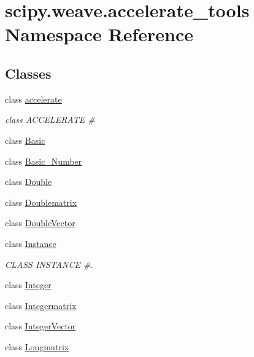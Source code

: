 \hypertarget{namespacescipy_1_1weave_1_1accelerate__tools}{}\section{scipy.\+weave.\+accelerate\+\_\+tools Namespace Reference}
\label{namespacescipy_1_1weave_1_1accelerate__tools}
\subsection*{Classes}
\begin{DoxyCompactItemize}
\item 
class \hyperlink{classscipy_1_1weave_1_1accelerate__tools_1_1accelerate}{accelerate}
\begin{DoxyCompactList}\small\item\em class A\+C\+C\+E\+L\+E\+R\+A\+T\+E \# \end{DoxyCompactList}\item 
class \hyperlink{classscipy_1_1weave_1_1accelerate__tools_1_1Basic}{Basic}
\item 
class \hyperlink{classscipy_1_1weave_1_1accelerate__tools_1_1Basic__Number}{Basic\+\_\+\+Number}
\item 
class \hyperlink{classscipy_1_1weave_1_1accelerate__tools_1_1Double}{Double}
\item 
class \hyperlink{classscipy_1_1weave_1_1accelerate__tools_1_1Doublematrix}{Doublematrix}
\item 
class \hyperlink{classscipy_1_1weave_1_1accelerate__tools_1_1DoubleVector}{Double\+Vector}
\item 
class \hyperlink{classscipy_1_1weave_1_1accelerate__tools_1_1Instance}{Instance}
\begin{DoxyCompactList}\small\item\em C\+L\+A\+S\+S I\+N\+S\+T\+A\+N\+C\+E \#. \end{DoxyCompactList}\item 
class \hyperlink{classscipy_1_1weave_1_1accelerate__tools_1_1Integer}{Integer}
\item 
class \hyperlink{classscipy_1_1weave_1_1accelerate__tools_1_1Integermatrix}{Integermatrix}
\item 
class \hyperlink{classscipy_1_1weave_1_1accelerate__tools_1_1IntegerVector}{Integer\+Vector}
\item 
class \hyperlink{classscipy_1_1weave_1_1accelerate__tools_1_1Longmatrix}{Longmatrix}
\item 

\end{DoxyCompactItemize}

